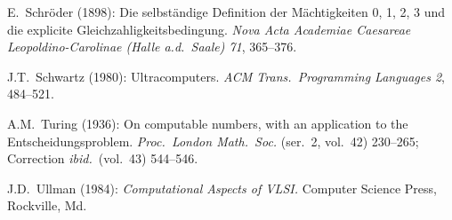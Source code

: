 \begin{thebibliography}{999}
E.~Schr\"{o}der (1898): Die selbst\"{a}ndige Definition der
M\"{a}chtigkeiten 0, 1, 2, 3 und die explicite
Gleichzahligkeitsbedingung.  {\it Nova Acta Academiae Caesareae
Leopoldino-Carolinae (Halle a.d.~Saale) 71}, 365--376.

J.T.~Schwartz (1980):
Ultracomputers.
{\it ACM Trans.~Programming Languages 2}, 484--521.



A.M.~Turing (1936): On computable numbers, with an application to the
Entscheidungsproblem.  {\it Proc.~London Math.~Soc.} (ser.~2, vol.~42)
230--265; Correction {\it ibid.}~(vol.~43) 544--546.


J.D.~Ullman (1984):
{\it Computational Aspects of VLSI.}
Computer Science Press, Rockville, Md.






\end{thebibliography}

